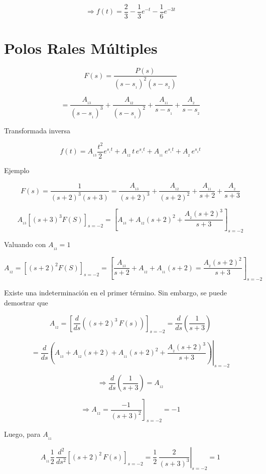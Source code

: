 $$\Rightarrow f(t) = \dfrac{2}{3} - \dfrac{1}{3} e^{-t} - \dfrac{1}{6} e^{-3t}$$





\section{Polos Rales Múltiples}

$$F(s) = \dfrac{P(s)}{(s - s_{_1})^2 (s - s_{_2})}$$

$$= \dfrac{A_{_{13}}}{(s - s_{_1})^3} + \dfrac{A_{_{12}}}{(s - s_{_1})^2} + \dfrac{A_{_{11}}}{s - s_{_1}} + \dfrac{A_{_2}}{s - s_{_2}}$$

Transformada inversa

$$f(t) = A_{_{13}} \dfrac{t^2}{2} e^{s_{_1} t} + A_{_{12}}\, t \, e^{s_{_1} t} + A_{_{11}}\,e^{s_{_1} t} + A_{_2}\, e^{s_{_2} t}$$

Ejemplo

$$F(s) = \dfrac{1}{(s + 2)^3 (s + 3)} = \dfrac{A_{_{13}}}{(s + 2)^3} + \dfrac{A_{_{12}}}{(s + 2)^2} + \dfrac{A_{_{11}}}{s + 2} + \dfrac{A_{_2}}{s + 3}$$

$$A_{_{13}} \left[ (s + 3)^3 F(S) \right]_{s = -2} = \left[ A_{_{13}} + A_{_{12}}(s + 2)^2 + \dfrac{A_{_2} (s + 2)^3}{s + 3} \right]_{s = -2}$$

Valuando con $A_{_{13}} = 1$

$$A_{_{12}} = \left[ (s + 2)^2 F(S) \right]_{s = -2} = \left[ \dfrac{A_{_{13}}}{s + 2} + A_{_{12}} + A_{_{11}}(s + 2) =\dfrac{A_{_2}(s + 2)^2}{s + 3} \right]_{s = -2}$$

Existe una indeterminación en el primer término. Sin embargo, se puede demostrar que

$$A_{_{12}} = \left[ \dfrac{d}{ds}\left( (s + 2)^3\, F(s) \right) \right]_{s = -2}  = \dfrac{d}{ds}\left( \dfrac{1}{s + 3} \right) $$

$$= \left. \dfrac{d}{ds} \left( A_{_{13}} + A_{_{12}}(s + 2) + A_{_{11}}(s + 2)^2 + \dfrac{A_{_{2}}(s + 2)^3 }{s + 3}\right)  \right|_{s = -2} $$

$$\Rightarrow \dfrac{d}{ds} \left( \dfrac{1}{s + 3} \right) = A_{_{12}}$$

$$\Rightarrow A_{_{12}} = \left. \dfrac{-1}{(s + 3)^2} \right]_{s = -2} = - 1$$

Luego, para $A_{_{11}}$

$$A_{_{11}} \dfrac{1}{2}\,\dfrac{d^2}{ds^2} \left[ (s + 2)^2\,F(s) \right]_{s = -2} = \left.  \dfrac{1}{2}\, \dfrac{2}{(s + 3)^3} \right|_{s = -2} = 1$$

